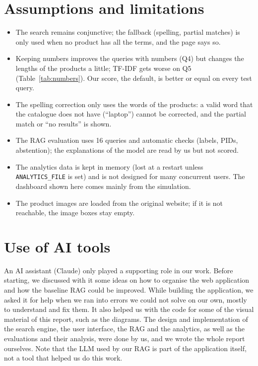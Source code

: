 \documentclass[11pt,a4paper]{article}
\newcommand{\code}[1]{\texttt{#1}}
\begin{document}
\section{Assumptions and limitations}
\begin{itemize}
\item The search remains conjunctive; the fallback (spelling, partial matches) is only used when no product has all
the terms, and the page says so.
\item Keeping numbers improves the queries with numbers (Q4) but changes the lengths of the products a little; TF-IDF
gets worse on Q5 (Table~\ref{tab:numbers}). Our score, the default, is better or equal on every test query.
\item The spelling correction only uses the words of the products: a valid word that the catalogue does not have
(``laptop'') cannot be corrected, and the partial match or ``no results'' is shown.
\item The RAG evaluation uses 16 queries and automatic checks (labels, PIDs, abstention); the explanations of the
model are read by us but not scored.
\item The analytics data is kept in memory (lost at a restart unless \code{ANALYTICS\_FILE} is set) and is not
designed for many concurrent users. The dashboard shown here comes mainly from the simulation.
\item The product images are loaded from the original website; if it is not reachable, the image boxes stay empty.
\end{itemize}

\section*{Use of AI tools}
An AI assistant (Claude) only played a supporting role in our work. Before starting, we discussed
with it some ideas on how to organise the web application and how the baseline RAG could be improved. While building
the application, we asked it for help when we ran into errors we could not solve on our own, mostly to understand
and fix them. It also helped us with the code for some of the visual material of this report, such as the diagrams.
The design and implementation of the search engine, the user interface, the RAG and the analytics, as well as the
evaluations and their analysis, were done by us, and we wrote the whole report ourselves. Note that the LLM used
by our RAG is part of the application itself, not a tool that helped us do this work.
\end{document}
